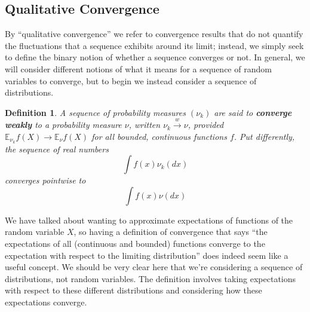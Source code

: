 \documentclass[12pt]{article}
\newcommand{\E}{\mathbb{E}}
\newtheorem{definition}{Definition}
\begin{document}
\subsection{Qualitative Convergence}
By ``qualitative convergence'' we refer to convergence results that do not quantify the fluctuations that a sequence exhibits around its limit; instead, we simply
seek to define the binary notion of whether a sequence converges or not. In general, we will consider different notions of what it means for a sequence of random 
variables to converge, but to begin we instead consider a sequence of distributions. 

\begin{definition}
A sequence of probability measures $(\nu_k)$ are said to \textbf{converge weakly} to a probability measure $\nu$, written $\nu_k \overset{w}{\to} \nu$, 
provided $\E_{\nu_k} f(X) \to \E_\nu f(X)$ for all bounded, continuous functions $f$. Put differently, the sequence of real numbers
\[\int f(x) \nu_k(dx) \]
converges pointwise to 
\[\int f(x) \nu(dx)\]
\end{definition}
We have talked about wanting to approximate expectations of functions of the random variable $X$, so having a definition of convergence that says 
``the expectations of all (continuous and bounded) functions converge to the expectation with respect to the limiting distribution'' does indeed seem like 
a useful concept. We should be very clear here that we're considering a sequence of distributions, not random variables. The definition involves taking 
expectations with respect to these different distributions and considering how these expectations converge. 
\end{document}
